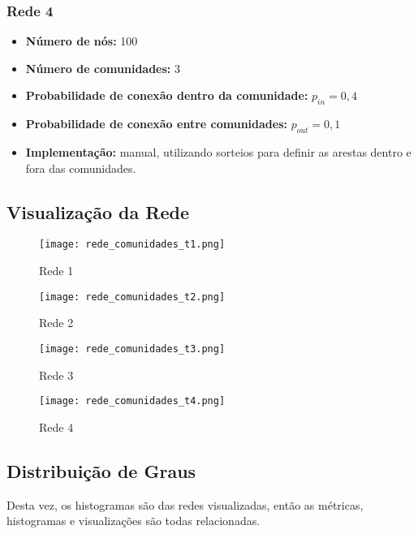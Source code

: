 \documentclass[a4paper]{article}
\begin{document}
\subsubsection{Rede 4}
\begin{itemize}
    \item \textbf{Número de nós:} 100
    \item \textbf{Número de comunidades:} 3
    \item \textbf{Probabilidade de conexão dentro da comunidade:} \(p_{in} = 0{,}4\)
    \item \textbf{Probabilidade de conexão entre comunidades:} \(p_{out} = 0{,}1\)
    \item \textbf{Implementação:} manual, utilizando sorteios para definir as arestas dentro e fora das comunidades.

\newpage

\end{itemize}
\subsection*{Visualização da Rede}

\begin{figure}[h]
\centering
\texttt{[image: rede\_comunidades\_t1.png]}
\caption{Rede 1}
\end{figure}

\begin{figure}[h]
\centering
\texttt{[image: rede\_comunidades\_t2.png]}
\caption{Rede 2}
\end{figure}

\newpage

\begin{figure}[h]
\centering
\texttt{[image: rede\_comunidades\_t3.png]}
\caption{Rede 3}
\end{figure}

\begin{figure}[h]
\centering
\texttt{[image: rede\_comunidades\_t4.png]}
\caption{Rede 4}
\end{figure}


\subsection*{Distribuição de Graus}

Desta vez, os histogramas são das redes visualizadas, então as métricas, histogramas e visualizações são todas relacionadas.
\end{document}
